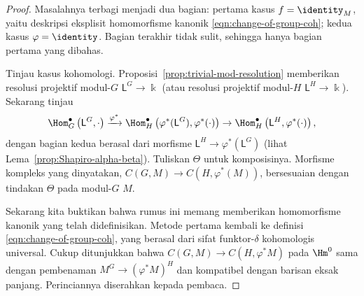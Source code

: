 \begin{proof}
	Masalahnya terbagi menjadi dua bagian: pertama kasus $f=\identity_M$, yaitu
	deskripsi eksplisit homomorfisme kanonik
	\eqref{eqn:change-of-group-coh}; kedua kasus $\varphi=\identity$. Bagian
	terakhir tidak sulit, sehingga hanya bagian pertama yang dibahas.

	Tinjau kasus kohomologi. Proposisi~\ref{prop:trivial-mod-resolution}
	memberikan resolusi projektif modul-$G$ $\mathsf{L}^G\to\Bbbk$ (atau
	resolusi projektif modul-$H$ $\mathsf{L}^H\to\Bbbk$). Sekarang tinjau
	\[ \Hom^\bullet_G \left( \mathsf{L}^G, \cdot\right) \xrightarrow{\varphi^*} \Hom^\bullet_H\left( \varphi^* (\mathsf{L}^G), \varphi^*(\cdot)\right) \to \Hom^\bullet_H\left(\mathsf{L}^H, \varphi^*(\cdot)\right), \]
	dengan bagian kedua berasal dari morfisme
	$\mathsf{L}^H\to\varphi^*(\mathsf{L}^G)$
	(lihat Lema~\ref{prop:Shapiro-alpha-beta}). Tuliskan $\Theta$ untuk
	komposisinya. Morfisme kompleks yang dinyatakan,
	$C(G,M)\to C(H,\varphi^*(M))$, bersesuaian dengan tindakan $\Theta$ pada
	modul-$G$ $M$.

	Sekarang kita buktikan bahwa rumus ini memang memberikan homomorfisme kanonik
	yang telah didefinisikan. Metode pertama kembali ke definisi
	\eqref{eqn:change-of-group-coh}, yang berasal dari sifat funktor-$\delta$
	kohomologis universal. Cukup ditunjukkan bahwa
	$C(G,M)\to C(H,\varphi^*M)$ pada $\Hm^0$ sama dengan pembenaman
	$M^G\to(\varphi^*M)^H$ dan kompatibel dengan barisan eksak panjang.
	Perinciannya diserahkan kepada pembaca.


\end{proof}
